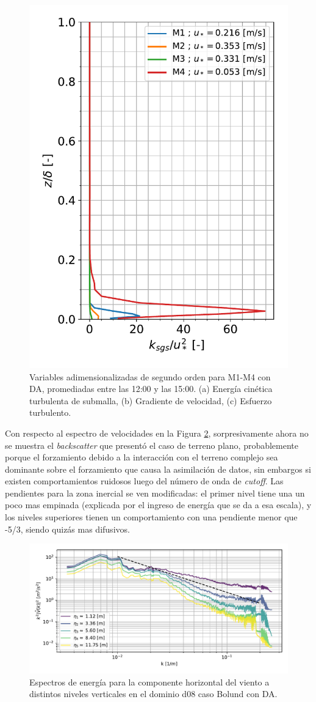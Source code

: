 \begin{figure}[H]
\begin{center}
		\includegraphics[height=0.5\linewidth,page=3,trim={12mm 5mm 3mm 0mm},clip]{Imagenes/06/bol_da/second_order_mean}%
	\end{center}
	\vspace{-5mm}
	\caption{Variables adimensionalizadas de segundo orden para M1-M4 con DA, promediadas entre las 12:00 y las 15:00. (a) Energía cinética turbulenta de submalla, (b) Gradiente de velocidad, (c) Esfuerzo turbulento. }
	\label{fig:06_bol_da_mean_secondorder}
\end{figure}
Con respecto al espectro de velocidades en la Figura \ref{fig:06_bol_da_spectrum}, sorpresivamente ahora no se muestra el \emph{backscatter} que presentó el caso de terreno plano, probablemente porque el forzamiento debido a la interacción con el terreno complejo sea dominante sobre el forzamiento que causa la asimilación de datos, sin embargos si existen comportamientos ruidosos luego del número de onda de \emph{cutoff}. Las pendientes para la zona inercial se ven modificadas: el primer nivel tiene una un poco mas empinada (explicada por el ingreso de energía que se da a esa escala), y los niveles superiores tienen un comportamiento con una pendiente menor que -5/3, siendo quizás mas difusivos.
\newpage
\begin{figure}[H]
	\centering
	\includegraphics[width=1.0\linewidth,page=1,trim={3mm 5mm 3mm 3mm},clip]{Imagenes/06/bol_da/spectra}%
	\caption{Espectros de energía para la componente horizontal del viento a distintos niveles verticales en el dominio d08 caso Bolund con DA.}
	\label{fig:06_bol_da_spectrum}
\end{figure}
